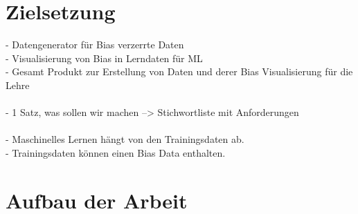     \section{Zielsetzung}
    \label{subsec:zielsetzung}
    -	Datengenerator für Bias verzerrte Daten \\
    -	Visualisierung von Bias in Lerndaten für ML \\
    -	Gesamt Produkt zur Erstellung von Daten und derer Bias Visualisierung für die Lehre \\
    \\
    -   1 Satz, was sollen wir machen --> Stichwortliste mit Anforderungen \\
    \\
    -   Maschinelles Lernen hängt von den Trainingsdaten ab.\\
    -   Trainingsdaten können einen Bias Data enthalten.\\

    \section{Aufbau der Arbeit}
    \label{subsec:aufbau der arbeit}


    \newpage